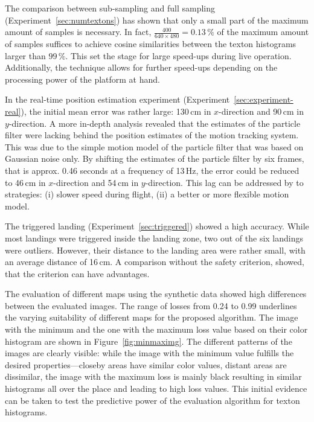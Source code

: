 \documentclass[11pt]{report}
\begin{document}
The comparison between sub-sampling and full sampling
(Experiment~\ref{sec:numtextons}) has shown that only a small part of
the maximum amount of samples is necessary. In fact,
$\frac{400}{640 \times 480} = 0.13\,\%$ of the maximum amount of
samples suffices to achieve cosine similarities between the texton
histograms larger than $99\,\%$. This set the stage for large
speed-ups during live operation. Additionally, the technique allows
for further speed-ups depending on the processing power of the
platform at hand.

In the real-time position estimation experiment
(Experiment~\ref{sec:experiment-real}), the initial mean error
was rather large: 130\,cm in $x$-direction and 90\,cm in
$y$-direction. A more in-depth analysis revealed that the estimates of
the particle filter were lacking behind the position estimates of the
motion tracking system. This was due to the simple motion model of the
particle filter that was based on Gaussian noise only. By shifting the
estimates of the particle filter by six frames, that is approx. 0.46
seconds at a frequency of 13\,Hz, the error could be reduced to 46\,cm
in $x$-direction and 54\,cm in $y$-direction. This lag can be
addressed by to strategies: (i) slower speed during flight, (ii) a
better or more flexible motion model.

The triggered landing (Experiment~\ref{sec:triggered}) showed a high
accuracy. While most landings were triggered inside the landing zone,
two out of the six landings were outliers. However, their distance to
the landing area were rather small, with an average distance of
16\,cm. A comparison without the safety criterion, showed, that the
criterion can have advantages.

The evaluation of different maps using the synthetic data showed high
differences between the evaluated images. The range of losses from
0.24 to 0.99 underlines the varying suitability of different maps for
the proposed algorithm.
The
image with the minimum and the one with the maximum loss value based
on their color histogram are shown in Figure~\ref{fig:minmaximg}. The
different patterns of the images are clearly visible: while the image
with the minimum value fulfills the desired properties---closeby areas
have similar color values, distant areas are dissimilar, the image
with the maximum loss is mainly black resulting in similar histograms
all over the place and leading to high loss values. This initial
evidence can be taken to test the predictive power of the evaluation
algorithm for texton histograms.
\end{document}
